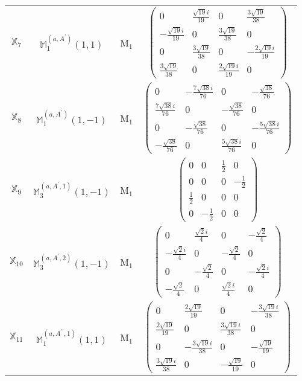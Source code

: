 \documentclass[fleqn,10pt,landscape]{article}
\begin{document}
\begin{itemize}
\begin{center}
\begin{longtable}{c|c|c|c}
$ \mathbb{X}_{7} $ & $\mathbb{M}_{1}^{(a,A^{\prime})}(1,1)$ & M$_{1}$ & $\begin{pmatrix} 0 & \frac{\sqrt{19} i}{19} & 0 & \frac{3 \sqrt{19}}{38} \\ - \frac{\sqrt{19} i}{19} & 0 & \frac{3 \sqrt{19}}{38} & 0 \\ 0 & \frac{3 \sqrt{19}}{38} & 0 & - \frac{2 \sqrt{19} i}{19} \\ \frac{3 \sqrt{19}}{38} & 0 & \frac{2 \sqrt{19} i}{19} & 0 \end{pmatrix}$ \\
$ \mathbb{X}_{8} $ & $\mathbb{M}_{1}^{(a,A^{\prime})}(1,-1)$ & M$_{1}$ & $\begin{pmatrix} 0 & - \frac{7 \sqrt{38} i}{76} & 0 & - \frac{\sqrt{38}}{76} \\ \frac{7 \sqrt{38} i}{76} & 0 & - \frac{\sqrt{38}}{76} & 0 \\ 0 & - \frac{\sqrt{38}}{76} & 0 & - \frac{5 \sqrt{38} i}{76} \\ - \frac{\sqrt{38}}{76} & 0 & \frac{5 \sqrt{38} i}{76} & 0 \end{pmatrix}$ \\
$ \mathbb{X}_{9} $ & $\mathbb{M}_{3}^{(a,A^{\prime},1)}(1,-1)$ & M$_{1}$ & $\begin{pmatrix} 0 & 0 & \frac{1}{2} & 0 \\ 0 & 0 & 0 & - \frac{1}{2} \\ \frac{1}{2} & 0 & 0 & 0 \\ 0 & - \frac{1}{2} & 0 & 0 \end{pmatrix}$ \\
$ \mathbb{X}_{10} $ & $\mathbb{M}_{3}^{(a,A^{\prime},2)}(1,-1)$ & M$_{1}$ & $\begin{pmatrix} 0 & \frac{\sqrt{2} i}{4} & 0 & - \frac{\sqrt{2}}{4} \\ - \frac{\sqrt{2} i}{4} & 0 & - \frac{\sqrt{2}}{4} & 0 \\ 0 & - \frac{\sqrt{2}}{4} & 0 & - \frac{\sqrt{2} i}{4} \\ - \frac{\sqrt{2}}{4} & 0 & \frac{\sqrt{2} i}{4} & 0 \end{pmatrix}$ \\
$ \mathbb{X}_{11} $ & $\mathbb{M}_{1}^{(a,A^{\prime\prime},1)}(1,1)$ & M$_{1}$ & $\begin{pmatrix} 0 & \frac{2 \sqrt{19}}{19} & 0 & - \frac{3 \sqrt{19} i}{38} \\ \frac{2 \sqrt{19}}{19} & 0 & \frac{3 \sqrt{19} i}{38} & 0 \\ 0 & - \frac{3 \sqrt{19} i}{38} & 0 & - \frac{\sqrt{19}}{19} \\ \frac{3 \sqrt{19} i}{38} & 0 & - \frac{\sqrt{19}}{19} & 0 \end{pmatrix}$ \\

\end{longtable}
\end{center}
\end{itemize}
\end{document}
